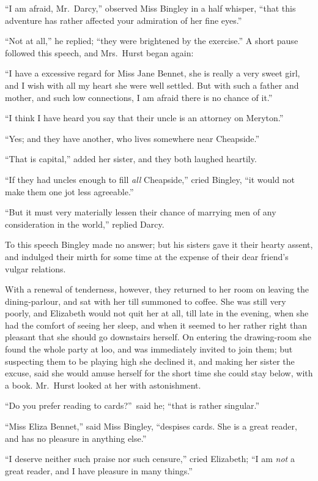 \documentclass[12pt,english,oneside]{book}
\begin{document}
{}``I am afraid, Mr.\ Darcy,'' observed Miss Bingley in a half
whisper, {}``that this adventure has rather affected your admiration
of her fine eyes.''

{}``Not at all,'' he replied; {}``they were brightened by the exercise.''
A short pause followed this speech, and Mrs.\ Hurst began again:

{}``I have a excessive regard for Miss Jane Bennet, she is really
a very sweet girl, and I wish with all my heart she were well settled.
But with such a father and mother, and such low connections, I am
afraid there is no chance of it.''

{}``I think I have heard you say that their uncle is an attorney
on Meryton.''

{}``Yes; and they have another, who lives somewhere near Cheapside.''

{}``That is capital,'' added her sister, and they both laughed heartily.

{}``If they had uncles enough to fill \textit{all} Cheapside,''
cried Bingley, {}``it would not make them one jot less agreeable.''

{}``But it must very materially lessen their chance of marrying men
of any consideration in the world,'' replied Darcy.

To this speech Bingley made no answer; but his sisters gave it their
hearty assent, and indulged their mirth for some time at the expense
of their dear friend's vulgar relations.

With a renewal of tenderness, however, they returned to her room on
leaving the dining-parlour, and sat with her till summoned to coffee.
She was still very poorly, and Elizabeth would not quit her at all,
till late in the evening, when she had the comfort of seeing her sleep,
and when it seemed to her rather right than pleasant that she should
go downstairs herself. On entering the drawing-room she found the
whole party at loo, and was immediately invited to join them; but
suspecting them to be playing high she declined it, and making her
sister the excuse, said she would amuse herself for the short time
she could stay below, with a book. Mr.\ Hurst looked at her with
astonishment.

{}``Do you prefer reading to cards?''\ said he; {}``that is rather
singular.''

{}``Miss Eliza Bennet,'' said Miss Bingley, {}``despises cards.
She is a great reader, and has no pleasure in anything else.''

{}``I deserve neither such praise nor such censure,'' cried Elizabeth;
{}``I am \textit{not} a great reader, and I have pleasure in many
things.''
\end{document}
